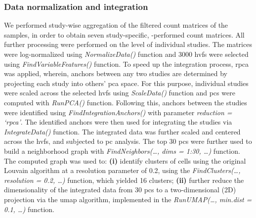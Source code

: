 \subsubsection{\large Data normalization and integration}
We performed study-wise aggregation of the filtered count matrices of the samples, in order to obtain seven study-specific, -performed count matrices. All further processing were performed on the level of individual studies. The matrices were log-normalized using \textit{NormalizeData()} function and 3000 \glspl{hvf} were selected using \textit{FindVariableFeatures()} function. To speed up the integration process, \gls{rpca} was applied, wherein, anchors between any two studies are determined by projecting each study into others’ \gls{pca} space. For this purpose, individual studies were scaled across the selected \glspl{hvf} using \textit{ScaleData()} function and \glspl{pc} were computed with \textit{RunPCA()} function. Following this, anchors between the studies were identified using \textit{FindIntegrationAnchors()} with parameter \textit{reduction = ‘rpca’}. The identified anchors were then used for integrating the studies via \textit{IntegrateData()} function. The integrated data was further scaled and centered across the \glspl{hvf}, and subjected to \gls{pc} analysis. The top 30 \glspl{pc} were further used to build a neighborhood graph with \textit{FindNeighbors(…, dims = 1:30, …)} function. The computed graph was used to: \textbf{(i)} identify clusters of cells using the original Louvain algorithm at a resolution parameter of 0.2, using the \textit{FindClusters(…, resolution = 0.2, …)} function, which yielded 16 clusters; \textbf{(ii)} further reduce the dimensionality of the integrated data from 30 \glspl{pc} to a two-dimensional (2D) projection via the \gls{umap} algorithm, implemented in the \textit{RunUMAP(…, min.dist = 0.1, …)} function.

